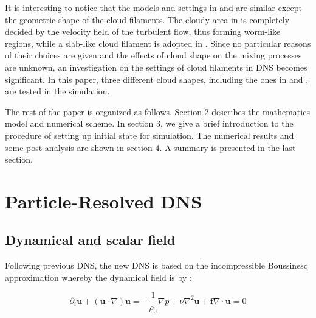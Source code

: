 \documentclass[12pt]{article}
\begin{document}
It is interesting to notice that the models and settings in \cite{Kumar11} and \cite{And04} are similar except the geometric shape of the cloud filaments. The cloudy area in \cite{And04} is completely decided by the velocity field of the turbulent flow, thus forming worm-like regions, while a slab-like cloud filament is adopted in \cite{Kumar11}. Since no particular reasons of their choices are given and the effects of cloud shape on the mixing processes are unknown, an investigation on the settings of cloud filaments in DNS becomes significant. In this paper, three different cloud shapes, including the ones in \cite{Kumar11} and \cite{And04}, are tested in the simulation.

The rest of the paper is organized as follows. Section 2 describes
the mathematics model and numerical scheme. In section 3, we give
a brief introduction to the procedure of setting up initial state for simulation. The numerical results and some post-analysis are shown
in section 4. A summary is presented in the last section. 
\section{Particle-Resolved DNS}


\subsection{Dynamical and scalar field}

Following previous DNS, the new DNS is based on the incompressible
Boussinesq approximation whereby the dynamical field is by \cite{And04}:

\begin{subequations}

\begin{equation}
\partial_{t}\mathbf{u}+(\mathbf{u}\cdot\nabla)\mathbf{u}=-\frac{1}{\rho_{0}}\nabla p+\nu\nabla^2 \mathbf{u}+\mathbf{f}\label{eq:NS1}
\end{equation}


\begin{equation}
\nabla\cdot \mathbf{u}=0\label{eq:NS2}
\end{equation}

\end{subequations}
\end{document}
